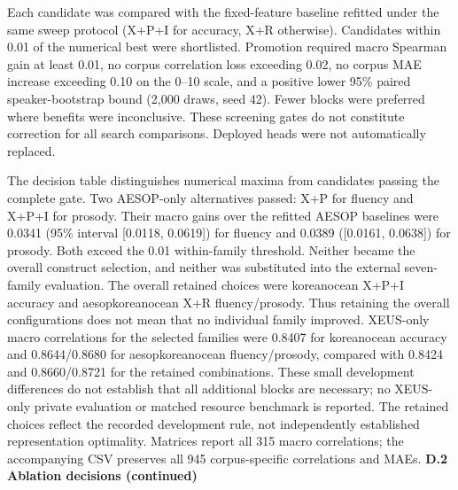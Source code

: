 \documentclass[10pt]{article}
\begin{document}
Each candidate was compared with the fixed-feature baseline refitted under the same sweep protocol (X+P+I for accuracy, X+R otherwise). Candidates within 0.01 of the numerical best were shortlisted. Promotion required macro Spearman gain at least 0.01, no corpus correlation loss exceeding 0.02, no corpus MAE increase exceeding 0.10 on the 0--10 scale, and a positive lower 95\% paired speaker-bootstrap bound (2,000 draws, seed 42). Fewer blocks were preferred where benefits were inconclusive. These screening gates do not constitute correction for all search comparisons. Deployed heads were not automatically replaced.

The decision table distinguishes numerical maxima from candidates passing the complete gate. Two AESOP-only alternatives passed: X+P for fluency and X+P+I for prosody. Their macro gains over the refitted AESOP baselines were 0.0341 (95\% interval [0.0118, 0.0619]) for fluency and 0.0389 ([0.0161, 0.0638]) for prosody. Both exceed the 0.01 within-family threshold. Neither became the overall construct selection, and neither was substituted into the external seven-family evaluation. The overall retained choices were koreanocean X+P+I accuracy and aesopkoreanocean X+R fluency/prosody. Thus retaining the overall configurations does not mean that no individual family improved. XEUS-only macro correlations for the selected families were 0.8407 for koreanocean accuracy and 0.8644/0.8680 for aesopkoreanocean fluency/prosody, compared with 0.8424 and 0.8660/0.8721 for the retained combinations. These small development differences do not establish that all additional blocks are necessary; no XEUS-only private evaluation or matched resource benchmark is reported. The retained choices reflect the recorded development rule, not independently established representation optimality. Matrices report all 315 macro correlations; the accompanying CSV preserves all 945 corpus-specific correlations and MAEs.
\clearpage
\noindent\textbf{D.2 Ablation decisions (continued)}
\end{document}
